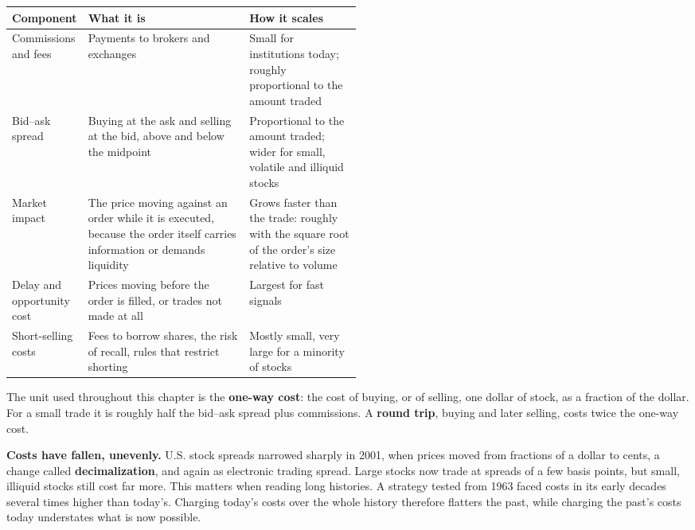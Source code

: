 \begin{center}
\small
\begin{tabularx}{0.9\linewidth}{@{}>{\raggedright\arraybackslash}p{0.19\linewidth}>{\raggedright\arraybackslash}X>{\raggedright\arraybackslash}p{0.32\linewidth}@{}}
\toprule
Component & What it is & How it scales \\
\midrule
Commissions and fees & Payments to brokers and exchanges & Small for institutions today; roughly proportional to the amount traded \\
Bid--ask spread & Buying at the ask and selling at the bid, above and below the midpoint & Proportional to the amount traded; wider for small, volatile and illiquid stocks \\
Market impact & The price moving against an order while it is executed, because the order itself carries information or demands liquidity & Grows faster than the trade: roughly with the square root of the order's size relative to volume \\
Delay and opportunity cost & Prices moving before the order is filled, or trades not made at all & Largest for fast signals \\
Short-selling costs & Fees to borrow shares, the risk of recall, rules that restrict shorting & Mostly small, very large for a minority of stocks \\
\bottomrule
\end{tabularx}
\end{center}

The unit used throughout this chapter is the \textbf{one-way cost}: the cost of buying, or of selling, one dollar of stock, as a fraction of the dollar. For a small trade it is roughly half the bid--ask spread plus commissions. A \textbf{round trip}, buying and later selling, costs twice the one-way cost.

\textbf{Costs have fallen, unevenly.} U.S. stock spreads narrowed sharply in 2001, when prices moved from fractions of a dollar to cents, a change called \textbf{decimalization}, and again as electronic trading spread. Large stocks now trade at spreads of a few basis points, but small, illiquid stocks still cost far more. This matters when reading long histories. A strategy tested from 1963 faced costs in its early decades several times higher than today's. Charging today's costs over the whole history therefore flatters the past, while charging the past's costs today understates what is now possible.

